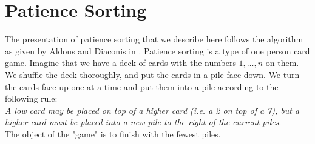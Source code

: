 \documentclass[12pt]{report}
\theoremstyle{definition}
\begin{document}
\section{Patience Sorting}
The presentation of patience sorting that we describe here follows the algorithm as given by Aldous and Diaconis in \cite{AldousDiaconis}.  Patience sorting is a type of one person card game.  Imagine that we have a deck of cards with the numbers $1,\dots,n$ on them.  We shuffle the deck thoroughly, and put the cards in a pile face down.  We turn the cards face up one at a time and put them into a pile according to the following rule: \\
{\em A low card may be placed on top of a higher card (i.e. a 2 on top of a 7), but a higher card must be placed into a new pile to the right of the current piles}. \\
The object of the "game" is to finish with the fewest piles.  
\end{document}
